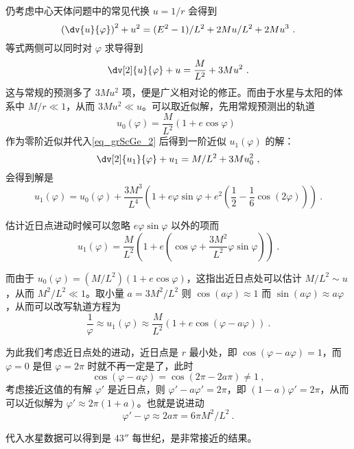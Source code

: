 仍考虑中心天体问题中的常见代换 $u = 1/r$ 会得到
\begin{equation}
\left( \dv{u}{\varphi} \right)^2 + u^2 = (E^2-1)/L^2 + 2Mu/L^2 + 2Mu^3 ~.
\end{equation}
等式两侧可以同时对 $\varphi$ 求导得到
\begin{equation}\label{eq_grScGe_2}
\dv[2]{u}{\varphi} + u = \frac{M}{L^2} + 3M u^2 ~.
\end{equation}
这与常规的预测多了 $3Mu^2$ 项，便是广义相对论的修正。而由于水星与太阳的体系中 $M/r \ll 1$，从而 $3Mu^2 \ll u$。可以取近似解，先用常规预测出的轨道
\begin{equation}
u_0(\varphi) = \frac{M}{L^2}(1 + e \cos \varphi) ~~
\end{equation}
作为零阶近似并代入\autoref{eq_grScGe_2} 后得到一阶近似 $u_1(\varphi)$ 的解：
\begin{equation}
\dv[2]{u_1}{\varphi} + u_1 = M/L^2 + 3M u_0^2 ~,
\end{equation}
会得到解是
\begin{equation}
u_1(\varphi) = u_0(\varphi) + \frac{3M^3}{L^4} \left( 1 + e\varphi \sin \varphi + e^2\left( \frac12 - \frac16 \cos(2\varphi) \right) \right) ~.
\end{equation}

估计近日点进动时候可以忽略 $e\varphi \sin \varphi$ 以外的项而
\begin{equation}
u_1(\varphi) = \frac{M}{L^2} \left( 1 + e\left(\cos \varphi + \frac{3M^2}{L^2} \varphi \sin \varphi \right) \right) ~.
\end{equation}

而由于 $u_0(\varphi) = (M/L^2) (1+e\cos \varphi)$，这指出近日点处可以估计 $M/L^2 \sim u$，从而 $M^2/L^2 \ll 1$。取小量 $a = 3M^2/L^2$ 则 $\cos(a\varphi) \approx 1$ 而 $\sin(a \varphi) \approx a\varphi$，从而可以改写轨道方程为
\begin{equation}
\frac{1}{\varphi} \approx u_1(\varphi) \approx \frac{M}{L^2} (1 + e \cos (\varphi - a \varphi)) ~.
\end{equation}

为此我们考虑近日点处的进动，近日点是 $r$ 最小处，即 $\cos(\varphi - a\varphi) = 1$，而 $\varphi=0$ 是但 $\varphi=2\pi$ 时就不再一定是了，此时
\begin{equation}
\cos(\varphi - a\varphi) = \cos(2\pi - 2a\pi) \neq 1 ~,
\end{equation}
考虑接近这值的有解 $\varphi'$ 是近日点，则 $\varphi' - a \varphi' = 2\pi$，即 $(1 - a) \varphi' = 2\pi$，从而可以近似解为 $\varphi' \approx 2\pi (1 + a)$。也就是说进动
\begin{equation}
\varphi' - \varphi \approx 2a\pi = 6\pi M^2/L^2 ~.
\end{equation}

代入水星数据可以得到是 $43''$ 每世纪，是非常接近的结果。


